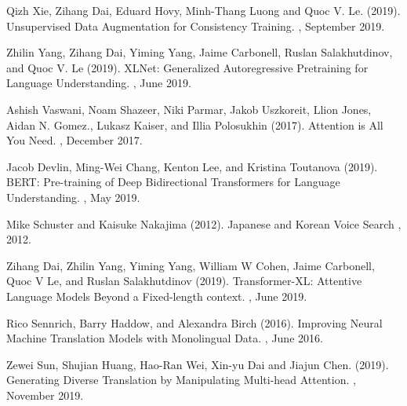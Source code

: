 \documentclass[twoside,twocolumn,10pt]{article}
\begin{document}
\begin{thebibliography}{99} %

Qizh Xie, Zihang Dai, Eduard Hovy, Minh-Thang Luong and Quoc V. Le. (2019).
\newblock Unsupervised Data Augmentation for Consistency Training.
, September 2019.

Zhilin Yang, Zihang Dai, Yiming Yang, Jaime Carbonell, Ruslan Salakhutdinov, and Quoc V. Le (2019).
\newblock XLNet: Generalized Autoregressive Pretraining for Language Understanding.
, June 2019.

Ashish Vaswani, Noam Shazeer, Niki Parmar, Jakob Uszkoreit, Llion Jones, Aidan N. Gomez., Lukasz Kaiser, and Illia Polosukhin (2017).
\newblock Attention is All You Need.
, December 2017.

Jacob Devlin, Ming-Wei Chang, Kenton Lee, and Kristina Toutanova (2019).
\newblock BERT: Pre-training of Deep Bidirectional Transformers for Language Understanding.
, May 2019.

Mike Schuster and Kaisuke Nakajima (2012).
\newblock Japanese and Korean Voice Search
 , 2012.
 
Zihang Dai, Zhilin Yang, Yiming Yang, William W Cohen, Jaime Carbonell, Quoc V Le,
and Ruslan Salakhutdinov (2019).
\newblock Transformer-XL: Attentive Language Models Beyond a Fixed-length
 context. 
, June 2019.

Rico Sennrich, Barry Haddow, and Alexandra Birch (2016). 
\newblock Improving Neural Machine Translation Models with Monolingual Data. 
, June 2016.

Zewei Sun, Shujian Huang, Hao-Ran Wei, Xin-yu Dai and Jiajun Chen. (2019).
\newblock Generating Diverse Translation by Manipulating Multi-head Attention.
, November 2019.


\end{thebibliography}
\end{document}
